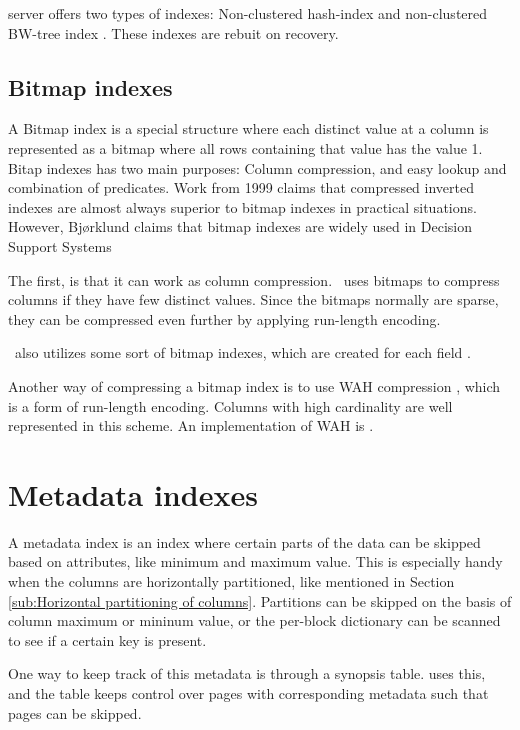 \mssql server offers two types of indexes: Non-clustered hash-index and non-clustered BW-tree index \cite{Delaney2014-ip, noauthor_undated-vq}. These indexes are rebuit on recovery.

\subsection{Bitmap indexes}
\label{sub:Bitmap indexes}
A Bitmap index is a special structure where each distinct value at a column is represented as a bitmap where all rows containing that value has the value 1. Bitap indexes has two main purposes: Column compression, and easy lookup and combination of predicates. Work from 1999 \cite{Witten1999-qq} claims that compressed inverted indexes are almost always superior to bitmap indexes in practical situations. However, Bjørklund claims that bitmap indexes are widely used in Decision Support Systems \cite{Bjorklund2011-wh}

The first, is that it can work as column compression. \cstore~uses bitmaps to compress columns if they have few distinct values. Since the bitmaps normally are sparse, they can be compressed even further by applying run-length encoding.

\qlikview~also utilizes some sort of bitmap indexes, which are created for each field \cite{Qlik2011-ef}.

Another way of compressing a bitmap index is to use WAH compression \cite{Bjorklund2011-wh}, which is a form of run-length encoding. Columns with high cardinality are well represented in this scheme. An implementation of WAH is .


\section{Metadata indexes}
\label{sec:Metadata indexes}
A metadata index is an index where certain parts of the data can be skipped based on attributes, like minimum and maximum value. This is especially handy when the columns are horizontally partitioned, like mentioned in Section \ref{sub:Horizontal partitioning of columns}. Partitions can be skipped on the basis of column maximum or mininum value, or the per-block dictionary can be scanned to see if a certain key is present.

One way to keep track of this metadata is through a synopsis table. \ibm uses this, and the table keeps control over pages with corresponding metadata such that pages can be skipped.

